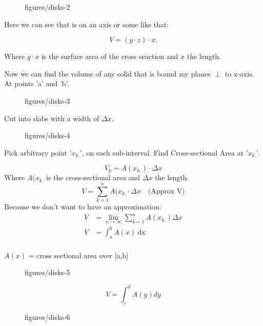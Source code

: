 \begin{figure}[ht]
    \centering
    \caption{figures/disks-2}
    \label{fig:disks-2}
\end{figure}        

Here we can see that is on an axis or some like that:

\[ V=\left( y\cdot z \right) \cdot x .\] 

Where $y\cdot x$ is the surface area of the cross seaction and $x$ the length.

Now we can find the volume of any solid that is bound my planes $\perp$ to x-axis.
At points 'a' and 'b'.

\vspace{20pt}

\begin{figure}[htbp]
    \centering
    \caption{figures/disks-3}
    \label{fig:disks-3}
\end{figure}
Cut into slabs with a width of $\Delta x$.

\begin{figure}[ht]
    \centering
    \caption{figures/disks-4}
    \label{fig:disks-4}
\end{figure}

Pick arbitrary point '$x_{k.}$', on each sub-interval. Find Cross-sectional Area at '$x_{k.}$'.

\[ V_k=A(x_{k.})\cdot \Delta x \] 
Where $A(x_{k.}$ is the cross-sectional area and $\Delta x$ the length.
\[V=\sum^n_{k=1} A(x_{k.}\cdot \Delta x \quad  \text{(Approx V)} \] 
Because we don't want to have an approximation:
\begin{align*}
    V&= \lim_{n\to\infty} \sum^n_{k=1}A(x_{k.})\Delta x \\
    V&= \int_{a}^{b} A(x) \ \text{dx}  \\
\end{align*}

$A(x)$ = cross sectional area over [a,b]

\vspace{50pt}


\begin{figure}[ht]
    \centering
    \caption{figures/disks-5}
    \label{fig:disks-5}
\end{figure}

\[V=\int_{c}^{d} A(y) dy\] 

\begin{figure}[ht]
    \centering
    \caption{figures/disks-6}
    \label{fig:disks-6}
\end{figure}

